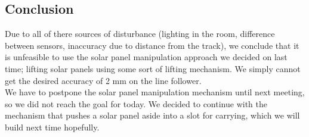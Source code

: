 \subsection{Conclusion}

Due to all of there sources of disturbance (lighting in the room,
difference between sensors, inaccuracy due to distance from the track),
we conclude that it is unfeasible to use the solar panel manipulation
approach we decided on last time; lifting solar panels using some sort
of lifting mechanism. We simply cannot get the desired accuracy of 2 mm
on the line follower.\\We have to postpone the solar panel manipulation
mechanism until next meeting, so we did not reach the goal for today. We
decided to continue with the mechanism that pushes a solar panel aside
into a slot for carrying, which we will build next time hopefully.
